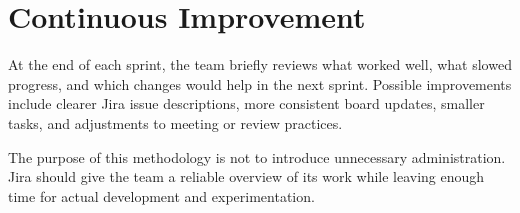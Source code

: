 \documentclass[12pt,a4paper]{article}
\begin{document}

\section{Continuous Improvement}

At the end of each sprint, the team briefly reviews what worked well,
what slowed progress, and which changes would help in the next sprint.
Possible improvements include clearer Jira issue descriptions, more
consistent board updates, smaller tasks, and adjustments to meeting or
review practices.

The purpose of this methodology is not to introduce unnecessary
administration. Jira should give the team a reliable overview of its
work while leaving enough time for actual development and experimentation.
\end{document}
